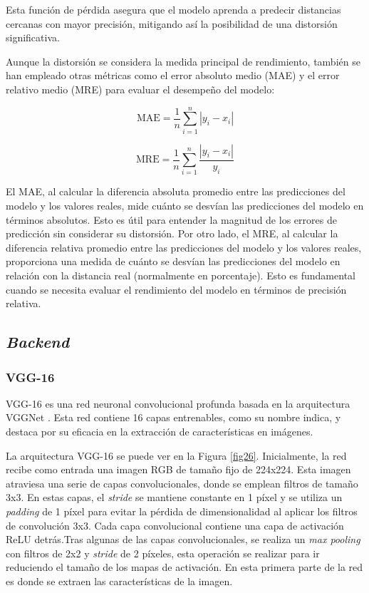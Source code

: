 Esta función de pérdida asegura que el modelo aprenda a predecir distancias cercanas con mayor precisión, mitigando así la posibilidad de una distorsión significativa.

Aunque la distorsión se considera la medida principal de rendimiento, también se han empleado otras métricas como el error absoluto medio (MAE) y el error relativo medio (MRE) para evaluar el desempeño del modelo:

\begin{equation}
	\text{MAE} = \frac{1}{n} \sum_{i=1}^{n} | y_i - x_i |
\end{equation}

\begin{equation}
	\text{MRE} = \frac{1}{n} \sum_{i=1}^{n} \frac{| y_i - x_i |}{y_i}
\end{equation}

El MAE, al calcular la diferencia absoluta promedio entre las predicciones del modelo y los valores reales, mide cuánto se desvían las predicciones del modelo en términos absolutos. Esto es útil para entender la magnitud de los errores de predicción sin considerar su distorsión.
Por otro lado, el MRE, al calcular la diferencia relativa promedio entre las predicciones del modelo y los valores reales, proporciona una medida de cuánto se desvían las predicciones del modelo en relación con la distancia real (normalmente en porcentaje). Esto es fundamental cuando se necesita evaluar el rendimiento del modelo en términos de precisión relativa.

\subsection{\textit{Backend}}

\subsubsection{VGG-16}\label{vgg16}

VGG-16 es una red neuronal convolucional profunda basada en la arquitectura VGGNet \cite{65}. Esta red contiene 16 capas entrenables, como su nombre indica, y destaca por su eficacia en la extracción de características en imágenes.

La arquitectura VGG-16 se puede ver en la Figura \ref{fig26}. Inicialmente, la red recibe como entrada una imagen RGB de tamaño fijo de 224x224. Esta imagen atraviesa una serie de capas convolucionales, donde se emplean filtros de tamaño 3x3. En estas capas, el \textit{stride} se mantiene constante en 1 píxel y se utiliza un \textit{padding} de 1 píxel para evitar la pérdida de dimensionalidad al aplicar los filtros de convolución 3x3. Cada capa convolucional contiene una capa de activación ReLU detrás.Tras algunas de las capas convolucionales, se realiza un \textit{max pooling} con filtros de 2x2 y \textit{stride} de 2 píxeles, esta operación se realizar para ir reduciendo el tamaño de los mapas de activación. En esta primera parte de la red es donde se extraen las características de la imagen.


